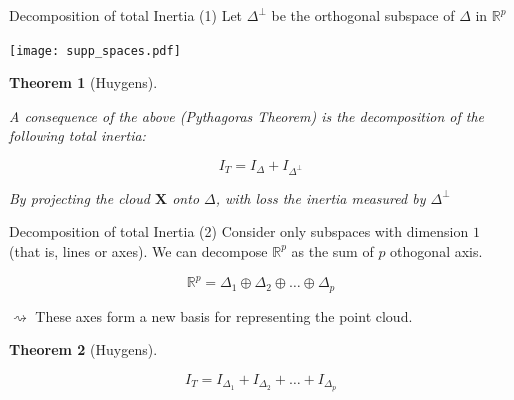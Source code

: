\documentclass[
  11pt,
  ignorenonframetext,
  notheorems]{beamer}
\newcommand{\Rset}{\mathbb{R}}
\newcommand{\1}{\mathbf{1}}
\newcommand{\bX}{\mathbf{X}}
\theoremstyle{plain}
\newtheorem{theorem}{Theorem}[section]
\theoremstyle{remark}
\begin{document}
\begin{frame}{Decomposition of total Inertia (1)}
\protect\hypertarget{decomposition-of-total-inertia-1}{}
Let \(\Delta^\bot\) be the orthogonal subspace of \(\Delta\) in
\(\Rset^p\)

\texttt{[image: supp\_spaces.pdf]}

\begin{theorem}[Huygens]\protect\hypertarget{thm-huygens}{}\label{thm-huygens}

A consequence of the above (Pythagoras Theorem) is the decomposition of
the following total inertia:

\begin{equation*}
  I_T = I_{\Delta} + I_{\Delta^\bot}
\end{equation*}

\alert{By projecting the cloud $\bX$ onto $\Delta$, with loss the inertia measured by $\Delta^\bot$}

\end{theorem}
\end{frame}

\begin{frame}{Decomposition of total Inertia (2)}
\protect\hypertarget{decomposition-of-total-inertia-2}{}
Consider only subspaces with dimension \(1\) (that is, lines or axes).
We can decompose \(\Rset^p\) as the sum of \(p\) othogonal axis.

\begin{equation*}
  \Rset^p = \Delta_1 \oplus \Delta_2 \oplus \dots \oplus \Delta_p
\end{equation*}

\alert{$\rightsquigarrow$ These axes form a new basis for representing the point cloud.}

\begin{theorem}[Huygens]\protect\hypertarget{thm-huygens2}{}\label{thm-huygens2}

\begin{equation*}
  I_{T} = I_{\Delta_1} + I_{\Delta_2} + \dots + I_{\Delta_p}
\end{equation*}

\end{theorem}
\end{frame}
\end{document}
